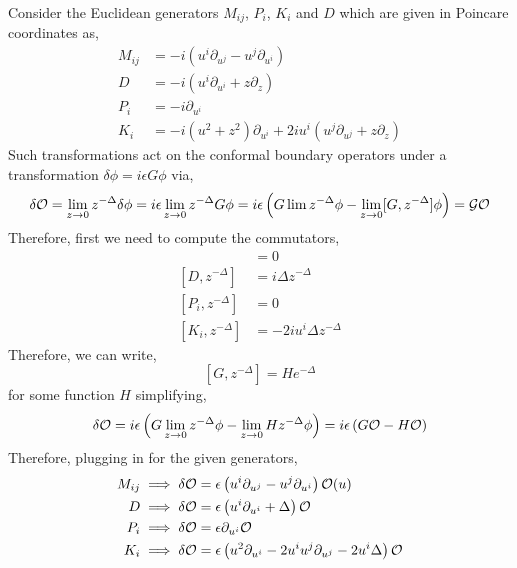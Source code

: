 \documentclass[12pt]{article}
\begin{document}
Consider the Euclidean generators $M_{ij}$, $P_i$, $K_i$ and $D$ which are given in Poincare coordinates as,
\begin{align*}
M_{ij} & = - i (u^i \partial_{u^j} - u^j \partial_{u^i}) 
\\
D & = - i ( u^i \partial_{u^i} + z \partial_z) 
\\
P_i & = - i \partial_{u^i}
\\
K_i & = - i(u^2 + z^2) \partial_{u^i} + 2 i u^i (u^j \partial_{u^j} + z \partial_z) 
\end{align*}
Such transformations act on the conformal boundary operators under a transformation $\delta \phi = i \epsilon G \phi$ via,
\begin{align*}
\delta \mathcal{O} = \lim_{z \to 0} z^{-\Delta} \delta \phi = i \epsilon \lim_{z \to 0} z^{-\Delta} G \phi = i \epsilon \left( G \lim z^{-\Delta} \phi - \lim_{z \to 0} [G, z^{-\Delta}] \phi \right) = \mathcal{G} \mathcal{O}
\end{align*}
Therefore, first we need to compute the commutators,
\begin{align*}
[M_{ij}, z^{-\Delta}] & = 0
\\
[D, z^{-\Delta}] & = i \Delta z^{-\Delta}
\\
[P_i, z^{-\Delta}] & = 0
\\
[K_i, z^{-\Delta}] & = - 2 i u^i \Delta z^{-\Delta}
\end{align*}
Therefore, we can write,
\[ [G, z^{-\Delta}] = H e^{-\Delta} \]
for some function $H$ simplifying,
\[ \delta \mathcal{O} = i \epsilon \left( G \lim_{z \to 0} z^{-\Delta} \phi - \lim_{z \to 0} H z^{-\Delta} \phi \right) = i \epsilon \left( G \mathcal{O} - H \mathcal{O} \right) \]
Therefore, plugging in for the given generators,
\begin{align*}
M_{ij} & \implies \delta \mathcal{O} = \epsilon \left( u^i \partial_{u^j} - u^j \partial_{u^i} \right) \mathcal{O}(u)
\\
D & \implies \delta \mathcal{O} = \epsilon \left( u^i \partial_{u^i} + \Delta \right) \mathcal{O}
\\
P_i & \implies \delta \mathcal{O} = \epsilon \partial_{u^i} \mathcal{O}
\\
K_i & \implies \delta \mathcal{O} = \epsilon \left( u^2 \partial_{u^i} - 2 u^i u^j \partial_{u^j} - 2 u^i \Delta  \right) \mathcal{O}
\end{align*}
\end{document}
